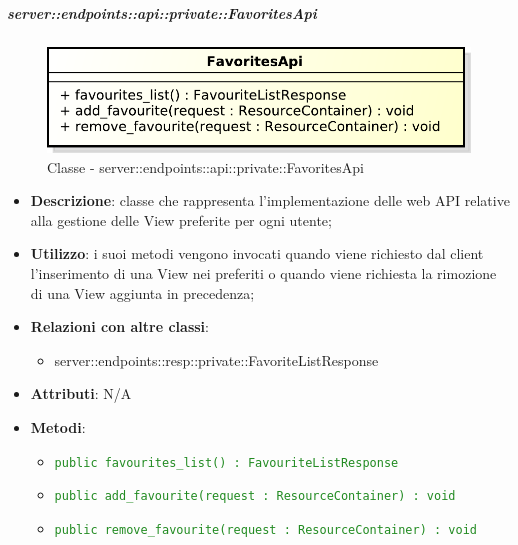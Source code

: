 
    \subparagraph{server::endpoints::api::private::FavoritesApi} %
    \label{subp:bdsm_app_server_endpoints_api_private_favoritesapi}
	\begin{figure}[!htbp]
		\centering
		\centerline{\includegraphics[scale=0.6]{./images/server/classes/endpoints/favorites_api.pdf}}
		\caption{Classe - server::endpoints::api::private::FavoritesApi}
	\end{figure}
    \begin{itemize}
      \item \textbf{Descrizione}: classe che rappresenta l'implementazione delle web API relative alla gestione delle View preferite per ogni utente;
      \item \textbf{Utilizzo}: i suoi metodi vengono invocati quando viene richiesto dal client l'inserimento di una View nei preferiti o quando viene richiesta la rimozione di una View aggiunta in precedenza;
      \item \textbf{Relazioni con altre classi}:
        \begin{itemize}
          \item server::endpoints::resp::private::FavoriteListResponse
        \end{itemize}
		\item \textbf{Attributi}: N/A
		\item \textbf{Metodi}:
			\begin{itemize}
				\item \textcolor{forestgreen}{\texttt{public favourites\_list() : FavouriteListResponse}}
				\item \textcolor{forestgreen}{\texttt{public add\_favourite(request : ResourceContainer) : void}}
				\item \textcolor{forestgreen}{\texttt{public remove\_favourite(request : ResourceContainer) : void}
        }
     	 \end{itemize}
      \end{itemize}
